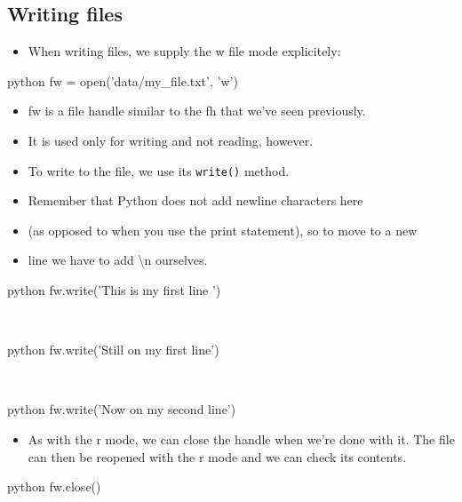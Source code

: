 \documentclass[aspectratio=1610,slidestop]{beamer}
\begin{document}
\subsection{Writing files}
\begin{pframe}
 \begin{itemize}
  \item When writing files, we supply the w file mode explicitely:
 \end{itemize}
 \begin{ipython}
  \begin{pythonin}{python}
fw = open('data/my_file.txt', 'w')
  \end{pythonin}
 \end{ipython}
 \begin{itemize}
  \item fw is a file handle similar to the fh that we've seen previously.
  \item It is used only for writing and not reading, however.
 \end{itemize}
\end{pframe}

\begin{pframe}
 \begin{itemize}
  \item To write to the file, we use its \texttt{write()} method.
  \item Remember that Python does not add newline characters here
  \item (as opposed to when you use the print statement), so to move to a new
  \item line we have to add \textbackslash n ourselves.
 \end{itemize}
 \begin{ipython}
  \begin{pythonin}{python}
fw.write('This is my first line ')
  \end{pythonin}
  \\
  \begin{pythonin}{python}
fw.write('Still on my first line\n')
  \end{pythonin}
  \\
  \begin{pythonin}{python}
fw.write('Now on my second line')
  \end{pythonin}
 \end{ipython}
\end{pframe}

\begin{pframe}
 \begin{itemize}
  \item As with the r mode, we can close the handle when we're done with it.
  The file can then be reopened with the r mode and we can check its contents.
 \end{itemize}
 \begin{ipython}
  \begin{pythonin}{python}
fw.close()
  \end{pythonin}
 \end{ipython}
\end{pframe}
\end{document}
